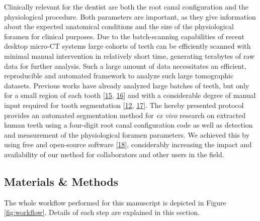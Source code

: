 \documentclass[
  american,
]{article}
\begin{document}
Clinically relevant for the dentist are both the root canal configuration and the physiological procedure.
Both parameters are important, as they give information about the expected anatomical conditions and the size of the physiological foramen for clinical purposes.
Due to the batch-scanning capabilities of recent desktop micro-CT systems large cohorts of teeth can be efficiently scanned with minimal manual intervention in relatively short time, generating terabytes of raw data for further analysis.
Such a large amount of data necessitates an efficient, reproducible and automated framework to analyze such large tomographic datasets.
Previous works have already analyzed large batches of teeth, but only for a small region of each tooth {[}\protect\hyperlink{ref-amSKhLb1}{15}, \protect\hyperlink{ref-DLVCfdzK}{16}{]} and with a considerable degree of manual input required for tooth segmentation {[}\protect\hyperlink{ref-OttTicsv}{12}, \protect\hyperlink{ref-ZTgDEakx}{17}{]}.
The hereby presented protocol provides an automated segmentation method for \emph{ex vivo} research on extracted human teeth using a four-digit root canal configuration code as well as detection and measurement of the physiological foramen parameters.
We achieved this by using free and open-source software {[}\protect\hyperlink{ref-11csWtgxP}{18}{]}, considerably increasing the impact and availability of our method for collaborators and other users in the field.

\hypertarget{materials-methods}{%
\subsection{Materials \& Methods}\label{materials-methods}}

The whole workflow performed for this manuscript is depicted in Figure \ref{fig:workflow}.
Details of each step are explained in this section.
\end{document}

